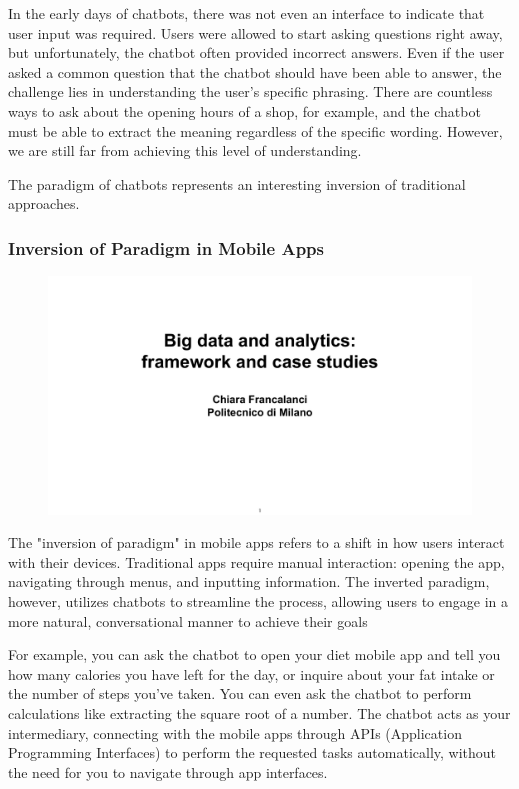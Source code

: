 In the early days of chatbots, there was not even an interface to
indicate that user input was required. Users were allowed to start
asking questions right away, but unfortunately, the chatbot often
provided incorrect answers. Even if the user asked a common question
that the chatbot should have been able to answer, the challenge lies in
understanding the user's specific phrasing. There are countless ways to
ask about the opening hours of a shop, for example, and the chatbot must
be able to extract the meaning regardless of the specific wording.
However, we are still far from achieving this level of understanding.

The paradigm of chatbots represents an interesting inversion of
traditional approaches.


\subsubsection{Inversion of Paradigm in Mobile
    Apps}\label{inversion-of-paradigm-in-mobile-apps}

\begin{figure}[!h]
    \centering
    \includegraphics[page=13, trim = 1.5cm 1.7cm 1.5cm 3.5cm, clip, width=\textwidth]{images/06 - BIG_DATA.pdf}
\end{figure}

The "inversion of paradigm" in mobile apps refers to a shift in how users interact with their devices. Traditional apps require manual interaction: opening the app, navigating through menus, and inputting information. The inverted paradigm, however, utilizes chatbots to streamline the process, allowing users to engage in a more natural, conversational manner to achieve their goals

For example, you can ask the chatbot to open your diet mobile app and
tell you how many calories you have left for the day, or inquire about
your fat intake or the number of steps you've taken. You can even ask
the chatbot to perform calculations like extracting the square root of a
number. The chatbot acts as your intermediary, connecting with the
mobile apps through APIs (Application Programming Interfaces) to perform
the requested tasks automatically, without the need for you to navigate
through app interfaces.

